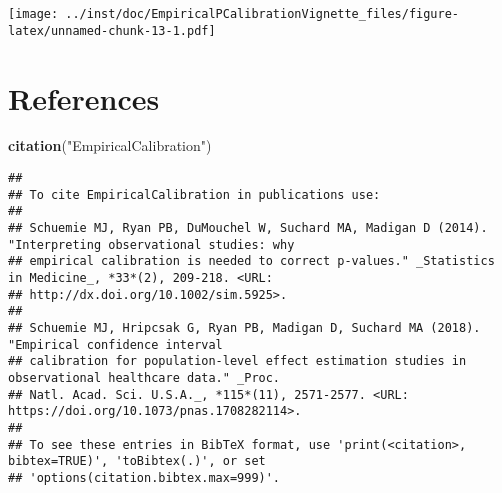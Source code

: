 \documentclass[
]{article}
\newenvironment{Shaded}{\begin{snugshade}}{\end{snugshade}}
\newcommand{\KeywordTok}[1]{\textcolor[rgb]{0.13,0.29,0.53}{\textbf{#1}}}
\newcommand{\NormalTok}[1]{#1}
\newcommand{\StringTok}[1]{\textcolor[rgb]{0.31,0.60,0.02}{#1}}
\begin{document}
\texttt{[image: ../inst/doc/EmpiricalPCalibrationVignette\_files/figure-latex/unnamed-chunk-13-1.pdf]}

\hypertarget{references}{%
\section{References}\label{references}}

\begin{Shaded}
\begin{Highlighting}[]
\KeywordTok{citation}\NormalTok{(}\StringTok{"EmpiricalCalibration"}\NormalTok{)}
\end{Highlighting}
\end{Shaded}

\begin{verbatim}
## 
## To cite EmpiricalCalibration in publications use:
## 
## Schuemie MJ, Ryan PB, DuMouchel W, Suchard MA, Madigan D (2014). "Interpreting observational studies: why
## empirical calibration is needed to correct p-values." _Statistics in Medicine_, *33*(2), 209-218. <URL:
## http://dx.doi.org/10.1002/sim.5925>.
## 
## Schuemie MJ, Hripcsak G, Ryan PB, Madigan D, Suchard MA (2018). "Empirical confidence interval
## calibration for population-level effect estimation studies in observational healthcare data." _Proc.
## Natl. Acad. Sci. U.S.A._, *115*(11), 2571-2577. <URL: https://doi.org/10.1073/pnas.1708282114>.
## 
## To see these entries in BibTeX format, use 'print(<citation>, bibtex=TRUE)', 'toBibtex(.)', or set
## 'options(citation.bibtex.max=999)'.
\end{verbatim}
\end{document}
